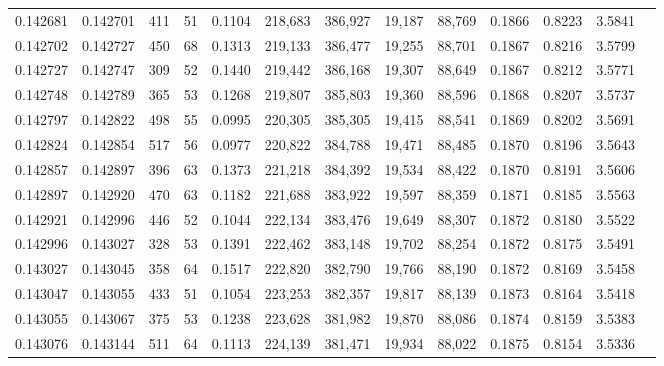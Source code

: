 \begin{tabular}{rrrrrrrrrrrrr}
0.142681 & 0.142701 &   411 &  51 &                                     0.1104 & 218,683 & 386,927 &  19,187 &  88,769 & 0.1866 & 0.8223 & 3.5841 \\
0.142702 & 0.142727 &   450 &  68 &                                     0.1313 & 219,133 & 386,477 &  19,255 &  88,701 & 0.1867 & 0.8216 & 3.5799 \\
0.142727 & 0.142747 &   309 &  52 &                                     0.1440 & 219,442 & 386,168 &  19,307 &  88,649 & 0.1867 & 0.8212 & 3.5771 \\
0.142748 & 0.142789 &   365 &  53 &                                     0.1268 & 219,807 & 385,803 &  19,360 &  88,596 & 0.1868 & 0.8207 & 3.5737 \\
0.142797 & 0.142822 &   498 &  55 &                                     0.0995 & 220,305 & 385,305 &  19,415 &  88,541 & 0.1869 & 0.8202 & 3.5691 \\
0.142824 & 0.142854 &   517 &  56 &                                     0.0977 & 220,822 & 384,788 &  19,471 &  88,485 & 0.1870 & 0.8196 & 3.5643 \\
0.142857 & 0.142897 &   396 &  63 &                                     0.1373 & 221,218 & 384,392 &  19,534 &  88,422 & 0.1870 & 0.8191 & 3.5606 \\
0.142897 & 0.142920 &   470 &  63 &                                     0.1182 & 221,688 & 383,922 &  19,597 &  88,359 & 0.1871 & 0.8185 & 3.5563 \\
0.142921 & 0.142996 &   446 &  52 &                                     0.1044 & 222,134 & 383,476 &  19,649 &  88,307 & 0.1872 & 0.8180 & 3.5522 \\
0.142996 & 0.143027 &   328 &  53 &                                     0.1391 & 222,462 & 383,148 &  19,702 &  88,254 & 0.1872 & 0.8175 & 3.5491 \\
0.143027 & 0.143045 &   358 &  64 &                                     0.1517 & 222,820 & 382,790 &  19,766 &  88,190 & 0.1872 & 0.8169 & 3.5458 \\
0.143047 & 0.143055 &   433 &  51 &                                     0.1054 & 223,253 & 382,357 &  19,817 &  88,139 & 0.1873 & 0.8164 & 3.5418 \\
0.143055 & 0.143067 &   375 &  53 &                                     0.1238 & 223,628 & 381,982 &  19,870 &  88,086 & 0.1874 & 0.8159 & 3.5383 \\
0.143076 & 0.143144 &   511 &  64 &                                     0.1113 & 224,139 & 381,471 &  19,934 &  88,022 & 0.1875 & 0.8154 & 3.5336 \\

\end{tabular}
